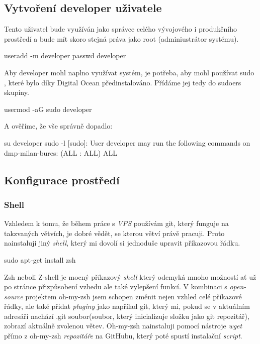 \documentclass[12pt,a4paper]{report}
\begin{document}
  \subsection{Vytvoření developer uživatele}
  Tento uživatel bude využíván jako správce celého vývojového i produkčního prostředí a bude mít skoro stejná
  práva jako root (adminiustrátor systému). \\
  \begin{bash}
    useradd -m developer
    passwd developer
  \end{bash}
  Aby developer mohl naplno využívat systém, je potřeba, aby mohl používat sudo , které bylo díky
  Digital Ocean předinstalováno. Přídáme jej tedy do sudoers skupiny.\\
  \begin{bash}
    usermod -aG sudo developer
  \end{bash}
  \clearpage
  A ověříme, že vše správně dopadlo:\\
  \begin{bash}
   su developer
   sudo -l
   [sudo]:
   User developer may run the following commands on dmp-milan-bures:
   (ALL : ALL) ALL
  \end{bash}


  \subsection{Konfigurace prostředí}
  \subsubsection{Shell}
  Vzhledem k tomu, že během práce s \emph{VPS} používám git, který funguje na takzvaných větvích, je dobré vědět, se kterou větví právě pracuji.
  Proto nainstaluji jiný \emph{shell}, který mi dovolí si jednoduše upravit příkazovou řádku.
  \begin{bash}
    sudo apt-get install zsh
  \end{bash}
  Zsh neboli Z-shell je mocný příkazový \emph{shell} který odemyká mnoho možností ať už po stránce přizpůsobení vzhedu ale také vylepšení funkcí.
  V kombinaci s \emph{open-source} projektem oh-my-zsh jsem schopen změnit nejen vzhled celé příkazové řádky, ale také přidat \emph{pluginy} jako napřílad 
  git, který mi, pokud se v aktuálním adresáři nachází .git soubor(soubor, který inicializuje složku jako git repozitář), zobrazí aktuálně zvolenou 
  větev. Oh-my-zsh nainstaluji pomocí nástroje \emph{wget} přímo z oh-my-zsh \emph{repozitáře} na GitHubu, který poté spustí instalační \emph{script}.
  
\end{document}
